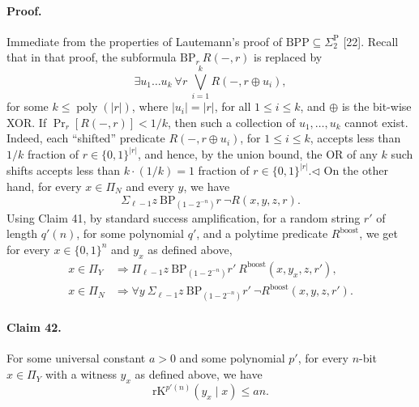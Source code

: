 \paragraph{Proof.} Immediate from the properties of Lautemann's proof of $\mathrm{BPP}\subseteq\Sigma_2^{\mathrm P}$ [22]. Recall that in that proof, the subformula $\mathrm{BP}_r\ R(-,r)$ is replaced by
\[\exists u_1\ldots u_k\ \forall r\ \bigvee_{i=1}^kR(-,r\oplus u_i),\]
for some $k\leq\operatorname{poly}(|r|)$, where $|u_i|=|r|$, for all $1\leq i\leq k$, and $\oplus$ is the bit-wise XOR. If $\Pr_r[R(-,r)]<1/k$, then such a collection of $u_1,\ldots,u_k$ cannot exist. Indeed, each ``shifted'' predicate $R(-,r\oplus u_i)$, for $1\leq i\leq k$, accepts less than $1/k$ fraction of $r\in\{0,1\}^{|r|}$, and hence, by the union bound, the OR of any $k$ such shifts accepts less than $k\cdot(1/k)=1$ fraction of $r\in\{0,1\}^{|r|}$.\hfill$\triangleleft$
On the other hand, for every $x\in\Pi_N$ and every $y$, we have
\[\Sigma_{\ell-1}z\ \mathrm{BP}_{(1-2^{-n})}r\ \neg R(x,y,z,r).\]
Using Claim 41, by standard success amplification, for a random string $r'$ of length $q'(n)$, for some polynomial $q'$, and a polytime predicate $R^{\mathrm{boost}}$, we get for every $x\in\{0,1\}^n$ and $y_x$ as defined above,
\begin{align*}
x\in\Pi_Y&\Longrightarrow\Pi_{\ell-1}z\ \mathrm{BP}_{(1-2^{-n})}r'\ R^{\mathrm{boost}}(x,y_x,z,r'),\tag{24}\\
x\in\Pi_N&\Longrightarrow\forall y\ \Sigma_{\ell-1}z\ \mathrm{BP}_{(1-2^{-n})}r'\ \neg R^{\mathrm{boost}}(x,y,z,r').\tag{25}
\end{align*}
\paragraph{Claim 42.} For some universal constant $a>0$ and some polynomial $p'$, for every $n$-bit $x\in\Pi_Y$ with a witness $y_x$ as defined above, we have
\[\mathrm{rK}^{p'(n)}(y_x\mid x)\leq an.\]
